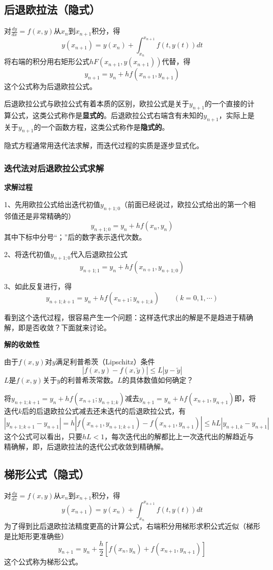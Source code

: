 \subsection{后退欧拉法（隐式）}
对$\frac{dy}{dx}=f(x,y)$从$x_n$到$x_{n+1}$积分，得
$$y(x_{n+1})=y(x_n)+\int_{x_n}^{x_{n+1}}f(t,y(t))dt$$
将右端的积分用右矩形公式$hF(x_{n+1},y(x_{n+1}))$代替，得
$$y_{n+1}=y_n+hf(x_{n+1},y_{n+1})$$
这个公式称为后退欧拉公式。

后退欧拉公式与欧拉公式有着本质的区别，欧拉公式是关于$y_{n+1}$的一个直接的计算公式，这类公式称作是\textbf{显式的}。后退欧拉公式右端含有未知的$y_{n+1}$，实际上是关于$y_{n+1}$的一个函数方程，这类公式称作是\textbf{隐式的}。

隐式方程通常用迭代法求解，而迭代过程的实质是逐步显式化。

\subsubsection{迭代法对后退欧拉公式求解}
\textbf{求解过程}

1、先用欧拉公式给出迭代初值$y_{n+1;0}$（前面已经说过，欧拉公式给出的第一个相邻值还是非常精确的）
$$y_{n+1;0}=y_n+hf(x_n,y_n)$$
其中下标中分号“；”后的数字表示迭代次数。

2、将迭代初值$y_{n+1;0}$代入后退欧拉公式
$$y_{n+1;1}=y_n+hf(x_{n+1},y_{n+1;0})$$


3、如此反复进行，得
$$y_{n+1;k+1}=y_n+hf(x_{n+1};y_{n+1;k}) \qquad (k=0,1,\cdots)$$

看到这个迭代过程，很容易产生一个问题：这样迭代求出的解是不是趋进于精确解，即是否收敛？下面就来讨论。



\textbf{解的收敛性}

由于$f(x,y)$对$y$满足利普希茨（Lipschitz）条件
$$|f(x,y)-f(x,\tilde{y})|\le L|y-\tilde{y}|$$
$L$是$f(x,y)$关于$y$的利普希茨常数。$L$的具体数值如何确定？

将$y_{n+1;k+1}=y_n+hf(x_{n+1};y_{n+1;k})$减去$y_{n+1}=y_n+hf(x_{n+1},y_{n+1})$即，将迭代$k$后的后退欧拉公式减去还未迭代的后退欧拉公式，有
$$|y_{n+1;k+1}-y_{n+1}|=h|f(x_{n+1},y_{n+1;k+1})-f(x_{n+1},y_{n+1})|
\le hL|y_{n+1,k}-y_{n+1}|$$
这个公式可以看出，只要$hL<1$，每次迭代出的解都比上一次迭代出的解趋近与精确解，即，后退欧拉法的迭代公式收敛到精确解。



\subsection{梯形公式（隐式）}
对$\frac{dy}{dx}=f(x,y)$从$x_n$到$x_{n+1}$积分，得
$$y(x_{n+1})=y(x_n)+\int_{x_n}^{x_{n+1}}f(t,y(t))dt$$
为了得到比后退欧拉法精度更高的计算公式，右端积分用梯形求积公式近似（梯形是比矩形更准确些）
$$y_{n+1}=y_n+\frac{h}{2}[f(x_n,y_n)+f(x_{n+1},y_{n+1})]$$
这个公式称为梯形公式。

